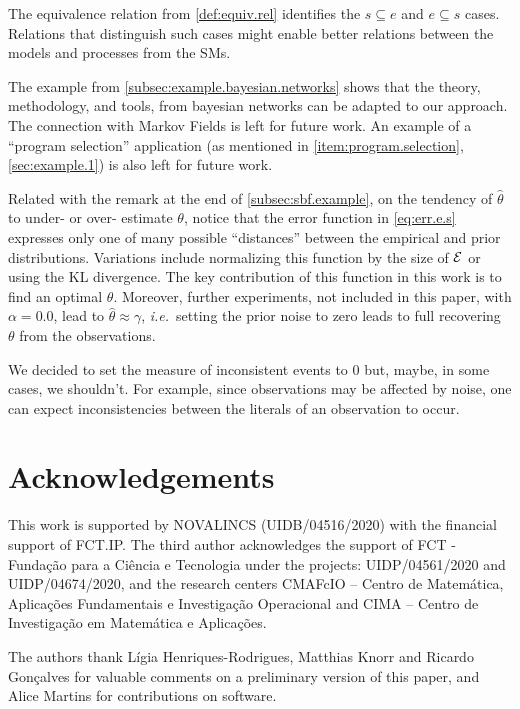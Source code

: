 \documentclass[a4paper, 10pt]{article}
\newcommand{\fml}[1]{\ensuremath{{\cal #1}}}
\newcommand{\oldnote}[1]{\note{#1}}
\newcounter{remark}
\newcommand{\note}[1]{
    \stepcounter{remark}%
    {\!\!\color{red}/}\footnotemark[\arabic{remark}]\!\!%
    \footnotetext[\arabic{remark}]{{\color{red}/}#1}
}
\begin{document}
The equivalence relation from \cref{def:equiv.rel} identifies the $s \subseteq e$ and $e \subseteq s$ cases. Relations that distinguish such cases might enable better relations between the models and processes from the \aclp{SM}.

The example from \cref{subsec:example.bayesian.networks} shows that the theory, methodology, and tools, from bayesian networks can be adapted to our approach. The connection with Markov Fields \cite{kindermann80} is left for future work. An example of a ``program selection'' application (as mentioned in \cref{item:program.selection}, \cref{sec:example.1}) is also left for future work.

Related with the remark at the end of \cref{subsec:sbf.example}, on the tendency of $\hat{\theta}$ to under- or over- estimate $\theta$, notice that the error function in \eqref{eq:err.e.s} expresses only one of many possible ``distances'' between the empirical and prior distributions. Variations include normalizing this function by the size of $\fml{E}$ or using the \acl{KL} divergence. The key contribution of this function in this work is to find an optimal $\theta$. Moreover, further experiments, not included in this paper, with $\alpha = 0.0$, lead to $\hat{\theta} \approx \gamma$, \emph{i.e.}\ setting the prior noise to zero leads to full recovering $\theta$ from the observations.

We decided to set the measure of inconsistent events to $0$ but, maybe, in some cases, we shouldn't. For example, since observations may be affected by noise, one can expect inconsistencies between the literals of an observation to occur.
%
%
%
\section*{Acknowledgements}
%
%
%
This work is supported by NOVALINCS (UIDB/04516/2020) with the financial support of FCT.IP.
The third author acknowledges the support of FCT - Funda\c{c}\~ao para a Ci\^{e}ncia e Tecnologia under the projects: UIDP/04561/2020 and UIDP/04674/2020, and the research centers CMAFcIO -- Centro de Matem\'{a}tica, Aplica\c{c}\~{o}es Fundamentais e Investiga\c{c}\~{a}o Operacional and CIMA -- Centro de Investigação em Matemática e Aplicações.

The authors thank Lígia Henriques-Rodrigues, Matthias Knorr and Ricardo Gonçalves for valuable comments on a preliminary version of this paper, and Alice Martins for contributions on software.
%
%
%
\printbibliography
%
%
%
\end{document}
